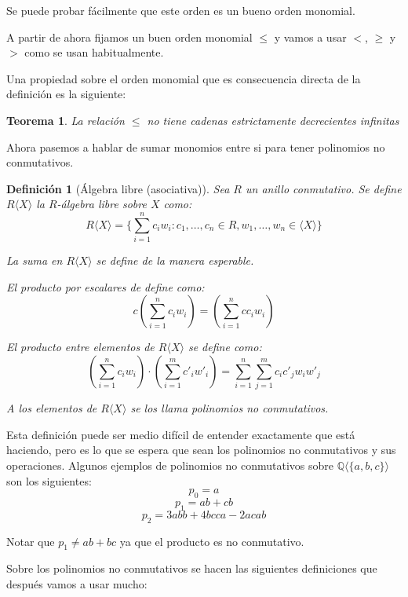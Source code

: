\documentclass{report}
\theoremstyle{customstyle}
\newtheorem{definition}{Definición}[chapter]
\newtheorem{theorem}{Teorema}[chapter]
\theoremstyle{factstyle}
\begin{document}
Se puede probar fácilmente que este orden es un bueno orden monomial.

A partir de ahora fijamos un buen orden monomial $≤$ y vamos a usar $<$, $≥$ y $>$ como se usan habitualmente.

Una propiedad sobre el orden monomial que es consecuencia directa de la definición es la siguiente:

\begin{theorem}\label{thm:≤ no cadenas dec inf}
  La relación $≤$ no tiene cadenas estrictamente decrecientes infinitas
\end{theorem}

Ahora pasemos a hablar de sumar monomios entre si para tener polinomios no conmutativos.

\begin{definition}[Álgebra libre (asociativa)]
  Sea $R$ un anillo conmutativo. Se define $R⟨X⟩$ la $R$-álgebra libre sobre $X$ como:
  \[ R⟨X⟩ = \{∑_{i = 1}^n c_i w_i : c_1, …, c_n ∈ R, w_1, …, w_n ∈ ⟨X⟩\} \]

  La suma en $R⟨X⟩$ se define de la manera esperable.

  El producto por escalares de define como:
  \[ c (∑_{i = 1}^n c_i w_i) = (∑_{i = 1}^n c c_i w_i) \]

  El producto entre elementos de $R⟨X⟩$ se define como:
  \[ (∑_{i = 1}^n c_i w_i) · (∑_{i = 1}^m c'_i w'_i) = ∑_{i = 1}^n ∑_{j = 1}^m c_i c'_j w_i w'_j \]

  A los elementos de $R⟨X⟩$ se los llama polinomios no conmutativos.
\end{definition}

Esta definición puede ser medio difícil de entender exactamente que está haciendo, pero es lo que se espera que sean los polinomios no conmutativos y sus operaciones. Algunos ejemplos de polinomios no conmutativos sobre $ℚ⟨\{a, b, c\}⟩$ son los siguientes:
\[ p_0 = a \]
\[ p_1 = ab + cb \]
\[ p_2 = 3 abb + 4 bcca - 2 acab \]

Notar que $p_1 ≠ ab + bc$ ya que el producto es no conmutativo.

Sobre los polinomios no conmutativos se hacen las siguientes definiciones que después vamos a usar mucho:
\end{document}
